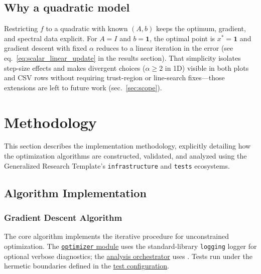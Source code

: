 \documentclass[
]{article}
\begin{document}
\subsection{Why a quadratic model}\label{why-a-quadratic-model}

Restricting \(f\) to a quadratic with known \((A,b)\) keeps the optimum,
gradient, and spectral data explicit. For \(A = I\) and
\(b = \mathbf{1}\), the optimal point is \(x^\ast = \mathbf{1}\) and
gradient descent with fixed \(\alpha\) reduces to a linear iteration in
the error (see eq.~\ref{eq:scalar_linear_update} in the results
section). That simplicity isolates step-size effects and makes divergent
choices (\(\alpha \geq 2\) in 1D) visible in both plots and CSV rows
without requiring trust-region or line-search fixes---those extensions
are left to future work (sec.~\ref{sec:scope}).

\newpage

\section{Methodology}\label{sec:methodology}

This section describes the implementation methodology, explicitly
detailing how the optimization algorithms are constructed, validated,
and analyzed using the Generalized Research Template's
\texttt{infrastructure} and \texttt{tests} ecosystems.

\subsection{Algorithm Implementation}\label{algorithm-implementation}

\subsubsection{Gradient Descent
Algorithm}\label{gradient-descent-algorithm}

The core algorithm implements the iterative procedure for unconstrained
optimization. The
\href{https://github.com/docxology/template/blob/main/projects/template_code_project/src/optimizer.py}{\texttt{optimizer}
module} uses the standard-library \texttt{logging} logger for optional
verbose diagnostics; the
\href{https://github.com/docxology/template/blob/main/projects/template_code_project/scripts/optimization_analysis.py}{analysis
orchestrator} uses
. Tests run under
the hermetic boundaries defined in the
\href{https://github.com/docxology/template/blob/main/projects/template_code_project/tests/conftest.py}{test
configuration}.
\end{document}
